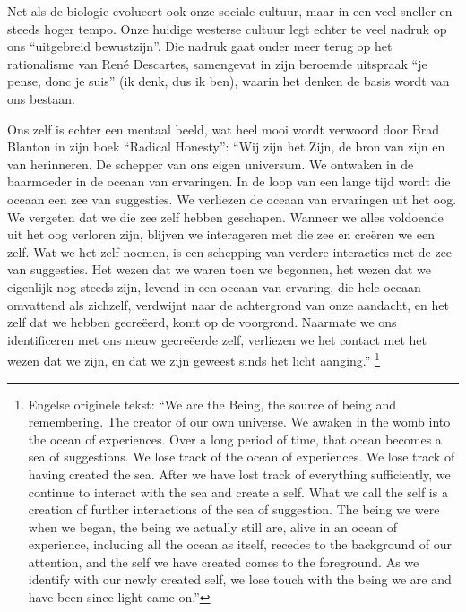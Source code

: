 \documentclass[
  11pt,
]{book}
\begin{document}
Net als de biologie evolueert ook onze sociale cultuur, maar in een veel sneller en steeds hoger tempo. Onze huidige westerse cultuur legt echter te veel nadruk op ons ``uitgebreid bewustzijn''. Die nadruk gaat onder meer terug op het rationalisme van René Descartes, samengevat in zijn beroemde uitspraak ``je pense, donc je suis'' (ik denk, dus ik ben), waarin het denken de basis wordt van ons bestaan.

Ons zelf is echter een mentaal beeld, wat heel mooi wordt verwoord door Brad Blanton in zijn boek ``Radical Honesty'': ``Wij zijn het Zijn, de bron van zijn en van herinneren. De schepper van ons eigen universum. We ontwaken in de baarmoeder in de oceaan van ervaringen. In de loop van een lange tijd wordt die oceaan een zee van suggesties. We verliezen de oceaan van ervaringen uit het oog. We vergeten dat we die zee zelf hebben geschapen. Wanneer we alles voldoende uit het oog verloren zijn, blijven we interageren met die zee en creëren we een zelf. Wat we het zelf noemen, is een schepping van verdere interacties met de zee van suggesties. Het wezen dat we waren toen we begonnen, het wezen dat we eigenlijk nog steeds zijn, levend in een oceaan van ervaring, die hele oceaan omvattend als zichzelf, verdwijnt naar de achtergrond van onze aandacht, en het zelf dat we hebben gecreëerd, komt op de voorgrond. Naarmate we ons identificeren met ons nieuw gecreëerde zelf, verliezen we het contact met het wezen dat we zijn, en dat we zijn geweest sinds het licht aanging.'' \citep{Blanton1996}\footnote{Engelse originele tekst: ``We are the Being, the source of being and remembering. The creator of our own universe. We awaken in the womb into the ocean of experiences. Over a long period of time, that ocean becomes a sea of suggestions. We lose track of the ocean of experiences. We lose track of having created the sea. After we have lost track of everything sufficiently, we continue to interact with the sea and create a self. What we call the self is a creation of further interactions of the sea of suggestion. The being we were when we began, the being we actually still are, alive in an ocean of experience, including all the ocean as itself, recedes to the background of our attention, and the self we have created comes to the foreground. As we identify with our newly created self, we lose touch with the being we are and have been since light came on.''}
\end{document}
